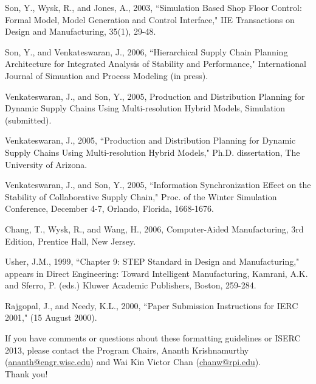 \documentclass{iserc}%
\begin{document}
\begin{thebibliography}{1}

Son, Y., Wysk, R., and Jones, A., 2003, \newblock ``Simulation Based Shop Floor Control: Formal Model, Model Generation and Control Interface," \newblock
IIE Transactions on Design and Manufacturing, 35(1), 29-48.

Son, Y., and Venkateswaran, J., 2006, \newblock ``Hierarchical Supply Chain Planning Architecture for Integrated Analysis of Stability and Performance," \newblock
International Journal of Simuation and Process Modeling (in press).

Venkateswaran, J., and Son, Y., 2005, Production and Distribution Planning for Dynamic Supply Chains Using Multi-resolution Hybrid Models, Simulation (submitted).

Venkateswaran, J., 2005, \newblock ``Production and Distribution Planning for Dynamic Supply Chains Using Multi-resolution Hybrid Models," \newblock
Ph.D. dissertation, The University of Arizona.

Venkateswaran, J., and Son, Y., 2005, \newblock ``Information Synchronization Effect on the Stability of Collaborative Supply Chain," \newblock
Proc. of the Winter Simulation Conference, December 4-7, Orlando, Florida, 1668-1676.

Chang, T., Wysk, R., and Wang, H., 2006, Computer-Aided Manufacturing, 3rd Edition, Prentice Hall, New Jersey.

Usher, J.M., 1999, \newblock ``Chapter 9: STEP Standard in Design and Manufacturing," \newblock
appears in Direct Engineering: Toward Intelligent Manufacturing, Kamrani, A.K. and Sferro, P. (eds.) Kluwer Academic Publishers, Boston, 259-284.

Rajgopal, J., and Needy, K.L., 2000, \newblock ``Paper Submission Instructions for IERC 2001," \newblock
(15 August 2000).

\end{thebibliography}

If you have comments or questions about these formatting guidelines or ISERC 2013, please contact the Program Chairs, Ananth Krishnamurthy
(\href{mailto:ananth@engr.wisc.edu}{ananth@engr.wisc.edu}) and Wai Kin Victor Chan (\href{mailto:chanw@rpi.edu}{chanw@rpi.edu}).\\
Thank you!
\end{document}
